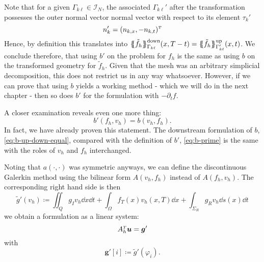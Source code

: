 \documentclass[../thesis.tex]{subfiles}
\begin{document}
Note that for a given $\Gamma_{k\ell} \in \mathcal{I}_N$, the associated $\Gamma_{k\ell}'$ after the transformation possesses the outer normal vector normal vector with respect to its element $\tau_k'$
\[
	n_k' = (n_{k,x}, -n_{k,t})^\tp
\]
Hence, by definition this translates into $\ldwnd \tilde{f}_h \rdwnd_{\Gamma_{k \ell}}(x, T - t) = \lupw \tilde{f}_h \rupw_{\Gamma_{k \ell}'}(x, t)$.
We conclude therefore, that using $b'$ on the problem for $f_h$ is the same as using $b$ on the transformed geometry for $\tilde{f}_h$. Given that the mesh was an arbitrary simplicial decomposition, this does not restrict us in any way whatsoever.
However, if we can prove that using $b$ yields a working method - which we will do in the next chapter - then so does $b'$ for the formulation with $- \partial_t f$.

A closer examination reveals even one more thing:
\[
	b'(f_h, v_h) = b(v_h, f_h).
\]
In fact, we have already proven this statement. The downstream formulation of $b$, \cref{eq:b-up-down-equal}, compared with the definition of $b'$, \cref{eq:b-prime} is the same with the roles of $v_h$ and $f_h$ interchanged.

Noting that $a(\cdot, \cdot)$ was symmetric anyways, we can define the discontinuous Galerkin method using the bilinear form $A(v_h, f_h)$ instead of $A(f_h, v_h)$.
The corresponding right hand side is then
\[
	\tilde{g}'(v_h) \coloneqq \iint_Q g_I v_h \dd x \dd t + \int_\Omega f_T(x) v_h(x, T) \dd x + \int_{\Sigma_R} g_R v_h \dd s(x) \dd t 
\]
we obtain a formulation as a linear system:
\[
	A_h^\tp \boldsymbol{u} = \boldsymbol{g}'
\]
with
\[
	\boldsymbol{g}'[i] \coloneqq \tilde{g}'(\varphi_i). 
\]
\end{document}
